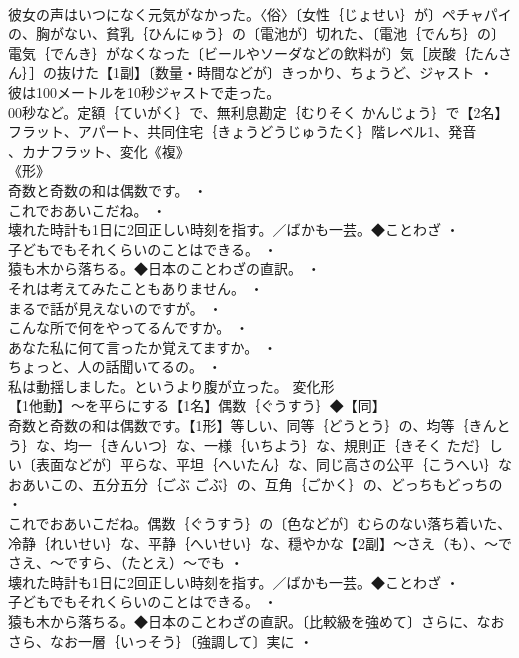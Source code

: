 \documentclass[8pt]{extreport}
\begin{document}
\begin{CJK}{UTF8}{min}
\\	彼女の声はいつになく元気がなかった。〈俗〉〔女性｛じょせい｝が〕ペチャパイの、胸がない、貧乳｛ひんにゅう｝の〔電池が〕切れた、〔電池｛でんち｝の〕電気｛でんき｝がなくなった〔ビールやソーダなどの飲料が〕気［炭酸｛たんさん｝］の抜けた【1副】〔数量・時間などが〕きっかり、ちょうど、ジャスト ・
\\	彼は100メートルを10秒ジャストで走った。
\\	00秒など。定額｛ていがく｝で、無利息勘定｛むりそく かんじょう｝で【2名】フラット、アパート、共同住宅｛きょうどうじゅうたく｝階レベル1、発音
\\	、カナフラット、変化《複》
\\	《形》
\\	奇数と奇数の和は偶数です。 ・
\\	これでおあいこだね。 ・
\\	壊れた時計も1日に2回正しい時刻を指す。／ばかも一芸。◆ことわざ ・
\\	子どもでもそれくらいのことはできる。 ・
\\	猿も木から落ちる。◆日本のことわざの直訳。 ・
\\	それは考えてみたこともありません。 ・
\\	まるで話が見えないのですが。 ・
\\	こんな所で何をやってるんですか。 ・
\\	あなた私に何て言ったか覚えてますか。 ・
\\	ちょっと、人の話聞いてるの。 ・
\\	私は動揺しました。というより腹が立った。	変化形 
\\	【1他動】～を平らにする【1名】偶数｛ぐうすう｝◆【同】
\\	奇数と奇数の和は偶数です。【1形】等しい、同等｛どうとう｝の、均等｛きんとう｝な、均一｛きんいつ｝な、一様｛いちよう｝な、規則正｛きそく ただ｝しい〔表面などが〕平らな、平坦｛へいたん｝な、同じ高さの公平｛こうへい｝なおあいこの、五分五分｛ごぶ ごぶ｝の、互角｛ごかく｝の、どっちもどっちの ・
\\	これでおあいこだね。偶数｛ぐうすう｝の〔色などが〕むらのない落ち着いた、冷静｛れいせい｝な、平静｛へいせい｝な、穏やかな【2副】～さえ（も）、～でさえ、～ですら、（たとえ）～でも ・
\\	壊れた時計も1日に2回正しい時刻を指す。／ばかも一芸。◆ことわざ ・
\\	子どもでもそれくらいのことはできる。 ・
\\	猿も木から落ちる。◆日本のことわざの直訳。〔比較級を強めて〕さらに、なおさら、なお一層｛いっそう｝〔強調して〕実に ・

\end{CJK}
\end{document}
